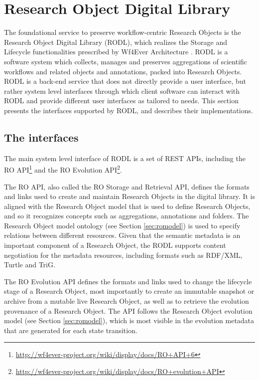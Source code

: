 \section{Research Object Digital Library}
\label{sec:rodl}


The foundational service to preserve workflow-centric Research Objects is the Research Object Digital Library (RODL), which realizes the Storage and Lifecycle functionalities prescribed by Wf4Ever Architecture \cite{w4fever_d132}. RODL is a software system which collects, manages and preserves aggregations of scientific workflows and related objects and annotations, packed into Research Objects. RODL is a back-end service that does not directly provide a user interface, but rather system level interfaces through which client software can interact with RODL and provide different user interfaces as tailored to needs. This section presents the interfaces supported by RODL, and describes their implementations.

\subsection{The interfaces}

The main system level interface of RODL is a set of REST APIs, including the RO API\footnote{\url{http://wf4ever-project.org/wiki/display/docs/RO+API+6}} and the RO Evolution API\footnote{\url{http://wf4ever-project.org/wiki/display/docs/RO+evolution+API}}.

The RO API, also called the RO Storage and Retrieval API, defines the formats and links used to create and maintain Research Objects in the digital library. It is aligned with the Research Object model that is used to define Research Objects, and so it recognizes concepts such as aggregations, annotations and folders. The Research Object model ontology (see Section \ref{sec:romodel}) is used to specify relations between different resources. Given that the semantic metadata is an important component of a Research Object, the RODL supports content negotiation for the metadata resources, including formats such as RDF/XML, Turtle and TriG.

The RO Evolution API defines the formats and links used to change the lifecycle stage of a Research Object, most importantly to create an immutable snapshot or archive from a mutable live Research Object, as well as to retrieve the evolution provenance of a Research Object. The API follows the Research Object evolution model (see Section \ref{sec:romodel}), which is most visible in the evolution metadata that are generated for each state transition.

